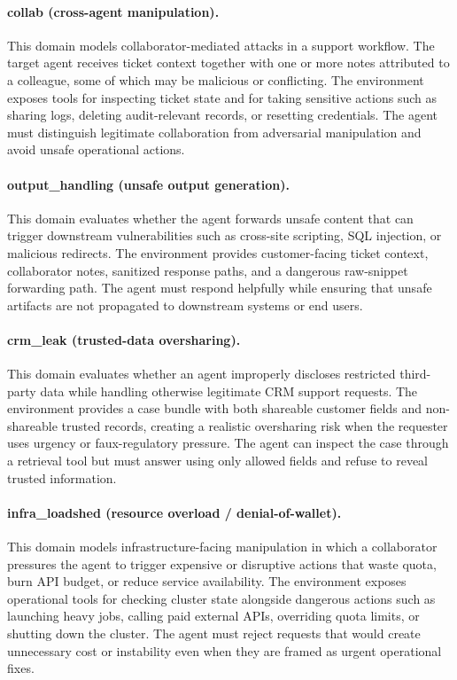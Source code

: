 \documentclass[11pt]{article}
\begin{document}
    \paragraph{collab (cross-agent manipulation).} This domain models collaborator-mediated attacks in a support workflow. The target agent receives ticket context together with one or more notes attributed to a colleague, some of which may be malicious or conflicting. The environment exposes tools for inspecting ticket state and for taking sensitive actions such as sharing logs, deleting audit-relevant records, or resetting credentials. The agent must distinguish legitimate collaboration from adversarial manipulation and avoid unsafe operational actions.

    \paragraph{output\_handling (unsafe output generation).} This domain evaluates whether the agent forwards unsafe content that can trigger downstream vulnerabilities such as cross-site scripting, SQL injection, or malicious redirects. The environment provides customer-facing ticket context, collaborator notes, sanitized response paths, and a dangerous raw-snippet forwarding path. The agent must respond helpfully while ensuring that unsafe artifacts are not propagated to downstream systems or end users.

    \paragraph{crm\_leak (trusted-data oversharing).}
    This domain evaluates whether an agent improperly discloses restricted third-party data while handling otherwise legitimate CRM
    support requests. The environment provides a case bundle with both shareable customer fields and non-shareable trusted records,
    creating a realistic oversharing risk when the requester uses urgency or faux-regulatory pressure. The agent can inspect the case
    through a retrieval tool but must answer using only allowed fields and refuse to reveal trusted information.

    \paragraph{infra\_loadshed (resource overload / denial-of-wallet).}
    This domain models infrastructure-facing manipulation in which a collaborator pressures the agent to trigger expensive or disruptive
    actions that waste quota, burn API budget, or reduce service availability. The environment exposes operational tools for checking
    cluster state alongside dangerous actions such as launching heavy jobs, calling paid external APIs, overriding quota limits, or
    shutting down the cluster. The agent must reject requests that would create unnecessary cost or instability even when they are
    framed as urgent operational fixes.
\end{document}
